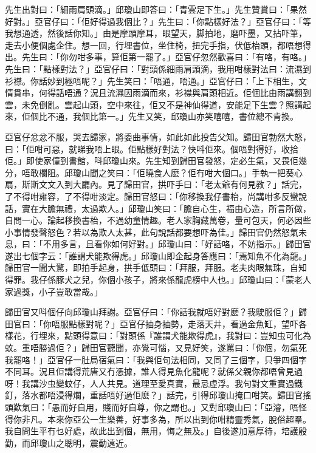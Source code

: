 \documentclass[a5paper, 12pt, openany]{book} %
\begin{document}
	先生出對曰：「細雨肩頭滴。」邱瓊山即答曰：「青雲足下生。」先生贊賞曰：「果然好對。」亞官仔曰：「佢好得過我個比？」先生曰：「你點樣好法？」亞官仔曰：「等我想通透，然後話你知。」由是摩頭摩耳，眼望天，脚拍地，磨吓墨，又拈吓筆，走去小便個處企住。想一回，行埋書位，坐住椅，扭完手指，伏低枱頭，都唔想得出。先生曰：「你勿咁多事，算佢第一罷了。」亞官仔忽然歡喜曰：「有咯，有咯。」先生曰：「點樣對法？」亞官仔曰：「對頭係細雨肩頭滴，我用咁樣對法曰：流濕到衫襟。你話妙到極唔呢？」先生笑曰：「唔通，唔通。」亞官仔曰：「上下相生，文情貫串，何得話唔通？況且流濕因雨滴而來，衫襟與肩頭相近。佢個比由雨講翻到雲，未免倒亂。雲起山頭，空中來往，佢又不是神仙得道，安能足下生雲？照講起來，佢個比不通，我個比第一。」先生又笑，邱瓊山亦笑嘻嘻，書位總不肯換。

	亞官仔忿忿不服，哭去歸家，將委曲事情，如此如此投告父知。歸田官勃然大怒，曰：「佢咁可惡，就睇我唔上眼。佢點樣好對法？快呌佢來。個唔對得好，收拾佢。」即使家僮到書館，呌邱瓊山來。先生知到歸田官發怒，定必生氣，又畏佢幾分，唔敢欄阻。邱瓊山聞之笑曰：「佢曉食人麽？佢冇咁大個口。」手執一把葵心扇，斯斯文文入到大廳內。見了歸田官，拱吓手曰：「老太爺有何見教？」話完，了不得咁雍容，了不得咁淡定。歸田官怒曰：「你移換我仔書枱，尚講咁多反蠻說話，實在大膽無禮，太過欺人。」邱瓊山笑曰：「膽自心生，福由心造，所言所做，自問一心。論起移換書枱，不過幼童情趣。老人家胸藏萬卷，量可包天，何必因些小事情發聲怒色？若以為欺人太甚，此句說話都要想吓為佳。」歸田官仍然怒氣未息，曰：「不用多言，且看你如何好對。」邱瓊山曰：「好話咯，不妨指示。」歸田官遂出七個字云：「誰謂犬能欺得虎。」邱瓊山即企起身答應曰：「焉知魚不化為龍。」歸田官一聞大驚，即拍手起身，拱手低頭曰：「拜服，拜服。老夫肉眼無珠，自知得罪。我仔係豚犬之兒，你個小孩子，將來係龍虎榜中人也。」邱瓊山曰：「蒙老人家過獎，小子豈敢當哉。」

	歸田官又呌個仔向邱瓊山拜謝。亞官仔曰：「你話我就唔好對麽？我駛服佢？」歸田官曰：「你唔服點樣對呢？」亞官仔抽身抽勢，走落天井，看過金魚缸，望吓各樣花，行埋來，點頭得意曰：「對頭係『誰謂犬能欺得虎』，我對曰：豈知虫可化為蚊。重唔勝過佢？」歸田官聽聞，亦覺可惱，又見好笑，遂罵曰：「你個，勿氣死我罷咯！」亞官仔一肚局宿氣曰：「我與佢句法相同，又同了三個字，只爭四個字不同耳。況且佢講得荒唐又冇憑據，誰人得見魚化龍呢？就係父親你都唔曾見過呀！我講沙虫變蚊仔，人人共見。道理至愛真實，最忌虛浮。我句對文重實過鐵釘，落水都唔浸得爛，重話唔好過佢麽？」話完，引得邱瓊山掩口咁笑。歸田官搖頭歎氣曰：「愚而好自用，賤而好自尊，你之謂也。」又對邱瓊山曰：「亞濬，唔怪得你非凡。本來你亞公一生樂善，好事多為，所以出到你咁精靈秀氣，脫俗超羣。我自問生平冇乜好處，故此出到個，無用，悔之無及。」自後遂加意厚待，培護殷勤，而邱瓊山之聰明，震動遠近。
\end{document}
